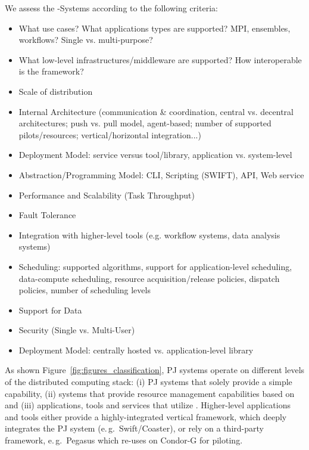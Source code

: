 \documentclass{sig-alternate}
\begin{document}
We assess the \pilotjob-Systems according to the following criteria:
\begin{itemize}
	\item What use cases? What applications types are supported? MPI, ensembles, workflows? Single vs. multi-purpose?
	\item What low-level infrastructures/middleware are supported? How interoperable is the framework?
	\item Scale of distribution
	\item Internal Architecture (communication \& coordination, central vs. decentral architectures; push vs. pull model, agent-based; number of supported pilots/resources; vertical/horizontal integration...)
	\item Deployment Model: service versus tool/library, application vs. system-level
    \item Abstraction/Programming Model: CLI, Scripting (SWIFT), API, Web service
	\item Performance and Scalability (Task Throughput)
	\item Fault Tolerance
	\item Integration with higher-level tools (e.g. workflow systems, data analysis systems)
	\item Scheduling: supported algorithms, support for application-level 
	scheduling, data-compute scheduling, resource acquisition/release policies, dispatch policies, number of scheduling levels
	\item Support for Data
	\item Security (Single vs. Multi-User)
	\item Deployment Model: centrally hosted vs. application-level library
\end{itemize}

As shown Figure~\ref{fig:figures_classification}, PJ systems operate on
different levels of the distributed computing stack: (i) PJ systems that
solely provide a simple \pilot capability, (ii) systems that provide resource
management capabilities based on \pilots and (iii) applications, tools and
services that utilize \pilots. Higher-level applications and tools either 
provide a highly-integrated vertical framework, which deeply integrates the PJ 
system (e.\,g.\ Swift/Coaster), or rely on a third-party 
\pilotjob framework, e.\,g.\ Pegasus which re-uses on Condor-G for piloting.
\end{document}
